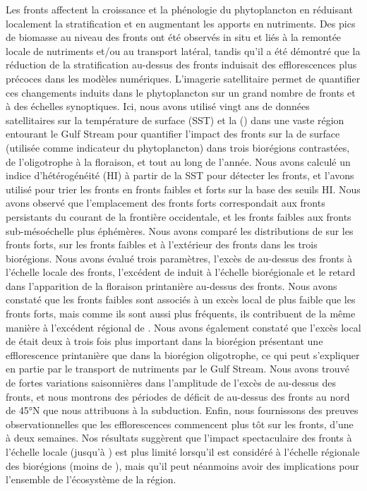 Les fronts affectent la croissance et la phénologie du phytoplancton en réduisant localement la stratification et en augmentant les apports en nutriments.
Des pics de biomasse au niveau des fronts ont été observés in situ et liés à la remontée locale de nutriments et/ou au transport latéral, tandis qu'il a été démontré que la réduction de la stratification au-dessus des fronts induisait des efflorescences plus précoces dans les modèles numériques.
L'imagerie satellitaire permet de quantifier ces changements induits dans le phytoplancton sur un grand nombre de fronts et à des échelles synoptiques. Ici, nous avons utilisé vingt ans de données satellitaires sur la température de surface (SST) et la  () dans une vaste région entourant le Gulf Stream pour quantifier l'impact des fronts sur la  de surface (utilisée comme indicateur du phytoplancton) dans trois biorégions contrastées, de l'oligotrophe à la floraison, et tout au long de l'année.
Nous avons calculé un indice d'hétérogénéité (HI) à partir de la SST pour détecter les fronts, et l'avons utilisé pour trier les fronts en fronts faibles et forts sur la base des seuils HI.
Nous avons observé que l'emplacement des fronts forts correspondait aux fronts persistants du courant de la frontière occidentale, et les fronts faibles aux fronts sub-mésoéchelle plus éphémères.
Nous avons comparé les distributions de  sur les fronts forts, sur les fronts faibles et à l'extérieur des fronts dans les trois biorégions.
Nous avons évalué trois paramètres, l'excès de  au-dessus des fronts à l'échelle locale des fronts, l'excédent de  induit à l'échelle biorégionale et le retard dans l'apparition de la floraison printanière au-dessus des fronts.
Nous avons constaté que les fronts faibles sont associés à un excès local de  plus faible que les fronts forts, mais comme ils sont aussi plus fréquents, ils contribuent de la même manière à l'excédent régional de .
Nous avons également constaté que l'excès local de  était deux à trois fois plus important dans la biorégion présentant une efflorescence printanière que dans la biorégion oligotrophe, ce qui peut s'expliquer en partie par le transport de nutriments par le Gulf Stream. Nous avons trouvé de fortes variations saisonnières dans l'amplitude de l'excès de  au-dessus des fronts, et nous montrons des périodes de déficit de  au-dessus des fronts au nord de 45°N que nous attribuons à la subduction.
Enfin, nous fournissons des preuves observationnelles que les efflorescences commencent plus tôt sur les fronts, d'une à deux semaines.
Nos résultats suggèrent que l'impact spectaculaire des fronts à l'échelle locale (jusqu'à ) est plus limité lorsqu'il est considéré à l'échelle régionale des biorégions (moins de ), mais qu'il peut néanmoins avoir des implications pour l'ensemble de l'écosystème de la région.

